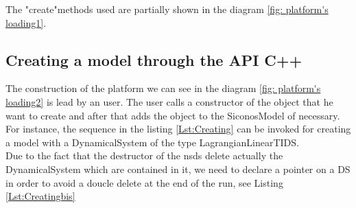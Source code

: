 The "create"methods used are partially shown in the diagram \ref{fig: platform's loading1}.







\subsection{Creating a model through the API C++}


The construction of the platform we can see in the diagram \ref{fig: platform's loading2} is lead by an user. The user calls a constructor of the object that he want to create and after that adds the object to the SiconosModel of necessary. For instance, the sequence in the listing \ref{Lst:Creating} can be invoked for creating a model with a DynamicalSystem of the type LagrangianLinearTIDS.\\

        








 Due to the fact that the destructor of the nsds delete actually the DynamicalSystem which are contained in it, we need to declare a pointer on a DS in  order to avoid a doucle delete at the end of the run, see Listing \ref{Lst:Creatingbis}


